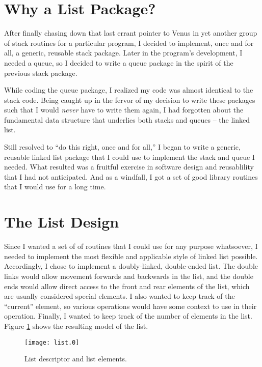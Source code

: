 \documentclass[fullpage,11pt]{article}
\begin{document}
\newpage
\tableofcontents
\bigskip
\listoffigures
\bigskip
\listoftables


\newpage
\pagestyle{plain}
\setcounter{page}{1}
\section{Why a List Package?}
After finally chasing down that last errant pointer to Venus in yet another
group of stack routines for a particular program, I decided to implement,
once and for all, a generic, reusable stack package.  Later in the program's
development, I needed a queue, so I decided to write a queue package in the
spirit of the previous stack package.

While coding the queue package, I realized my code was almost identical to the
stack code.  Being caught up in the fervor of my decision to write these
packages such that I would {\em never} have to write them again, I had
forgotten about the fundamental data structure that underlies both stacks and
queues -- the linked list.

Still resolved to ``do this right, once and for all,'' I began to write a
generic, reusable linked list package that I could use to implement the stack
and queue I needed.  What resulted was a fruitful exercise in software design
and reusablility that I had not anticipated.  And as a windfall, I got a set
of good library routines that I would use for a long time.


\section{The List Design}
Since I wanted a set of of routines that I could use for any purpose
whatsoever, I needed to implement the most flexible and applicable style of
linked list possible.  Accordingly, I chose to implement a doubly-linked,
double-ended list.  The double links would allow movement forwards and
backwards in the list, and the double ends would allow direct access to the
front and rear elements of the list, which are usually considered special
elements.  I also wanted to keep track of the ``current'' element, so various
operations would have some context to use in their operation.  Finally, I
wanted to keep track of the number of elements in the list.  Figure
\ref{fig:list} shows the resulting model of the list.

\begin{figure}[h]
\begin{center}
	\texttt{[image: list.0]}
	\caption{List descriptor and list elements.}
	\label{fig:list}
\end{center}
\end{figure}
\end{document}
